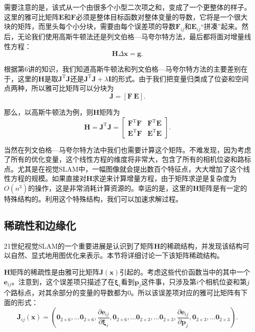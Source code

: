 需要注意的是，该式从一个由很多个小型二次项之和，变成了一个更整体的样子。这里的雅可比矩阵$\bm{E}$和$\bm{F}$必须是整体目标函数对整体变量的导数，它将是一个很大块的矩阵，而里头每个小分块，需要由每个误差项的导数$\bm{F}_{ij}$和$\bm{E}_{ij}$“拼凑”起来。然后，无论我们使用高斯牛顿法还是列文伯格—马夸尔特方法，最后都将面对增量线性方程：
\begin{equation}
\bm{H} \Delta \bm{x} = \bm{g}.
\end{equation}

\clearpage
根据第6讲的知识，我们知道高斯牛顿法和列文伯格—马夸尔特方法的主要差别在于，这里的$\bm{H}$是取$\bm{J}^\mathrm{T}\bm{J}$还是$\bm{J}^\mathrm{T}\bm{J}+ \lambda \bm{I}$的形式。由于我们把变量归类成了位姿和空间点两种，所以雅可比矩阵可以分块为
\begin{equation}
\bm{J}=[\bm{F} \ \bm{E}].
\end{equation}

那么，以高斯牛顿法为例，则$\bm{H}$矩阵为
\begin{equation}\label{eq:HessianMatrix}
\bm{H} = \bm{J}^\mathrm{T}\bm{J} =
\begin{bmatrix}
         \bm{F}^\mathrm{T}\bm{F}   &   \bm{F}^\mathrm{T}\bm{E}   \\ 
         \bm{E}^\mathrm{T}\bm{F}   &   \bm{E}^\mathrm{T}\bm{E}
\end{bmatrix} .
\end{equation}

当然在列文伯格—马夸尔特方法中我们也需要计算这个矩阵。不难发现，因为考虑了所有的优化变量，这个线性方程的维度将非常大，包含了所有的相机位姿和路标点。尤其是在视觉SLAM中，一幅图像就会提出数百个特征点，大大增加了这个线性方程的规模。如果直接对$\bm{H}$求逆来计算增量方程，由于矩阵求逆是复杂度为$O(n^3)$的操作\textsuperscript{\cite{Sueli2003}}，这是非常消耗计算资源的。幸运的是，这里的$\bm{H}$矩阵是有一定的特殊结构的。利用这个特殊结构，我们可以加速求解过程。

\subsection{稀疏性和边缘化}
21世纪视觉SLAM的一个重要进展是认识到了矩阵$\bm{H}$的稀疏结构，并发现该结构可以自然、显式地用图优化来表示\textsuperscript{\cite{Kummerle2011, Polok2013}}。本节将详细讨论一下该矩阵稀疏结构。

$\bm{H}$矩阵的稀疏性是由雅可比矩阵$\bm{J}(\bm{x})$引起的。考虑这些代价函数当中的其中一个$\bm{e}_{ij}$。注意到，这个误差项只描述了在$\bm{\xi}_i$看到$\bm{p}_j$这件事，只涉及第$i$个相机位姿和第$j$个路标点，对其余部分的变量的导数都为0。所以该误差项对应的雅可比矩阵有下面的形式：
\begin{equation}
\bm{J}_{ij}(\bm{x}) = \left(
\bm{0}_{2 \times 6},...
\bm{0}_{2 \times 6},
\frac{\partial \bm{e}_{ij}}{\partial \bm{\xi}_i},
\bm{0}_{2 \times 6},...
\bm{0}_{2 \times 3},...
\bm{0}_{2 \times 3},
\frac{\partial \bm{e}_{ij}}{ \partial \bm{p}_j},
\bm{0}_{2 \times 3},...
\bm{0}_{2 \times 3} 
\right) .
\end{equation}

